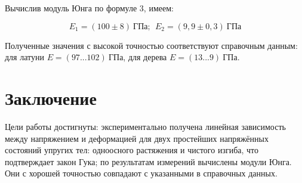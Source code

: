 \documentclass{article}
\begin{document}
Вычислив модуль Юнга по формуле 3, имеем:

\begin{equation}
	\boxed{E_1 = (100 \pm 8) \ ГПа; \ \ E_2 = (9,9 \pm 0,3) \ ГПа}
\end{equation}

Полученные значения с высокой точностью соответствуют справочным данным: для латуни $E = (97 ... 102) \ ГПа$, для дерева $E = (13 ... 9) \ ГПа$.


\section*{Заключение}
\hspace{4mm} Цели работы достигнуты: экспериментально получена линейная зависимость между напряжением и деформацией для двух простейших напряжённых состояний упругих тел: одноосного растяжения и чистого изгиба, что подтверждает закон Гука; по результатам измерений вычислены модули Юнга. Они с хорошей точностью совпадают с указанными в справочных данных. 
\end{document}
